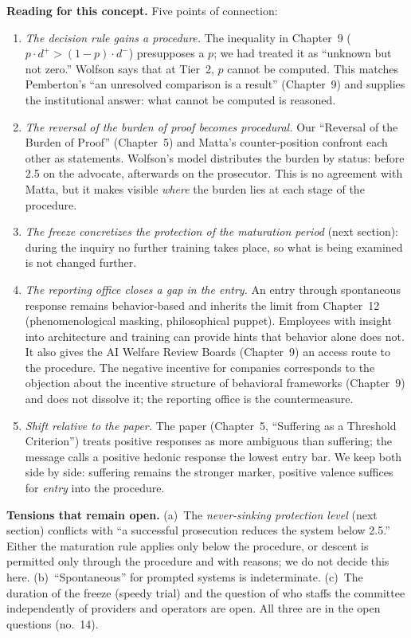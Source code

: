 \documentclass[acmlarge, nonacm]{acmart}
\begin{document}
\textbf{Reading for this concept.} Five points of connection:
\begin{enumerate}
\item \textit{The decision rule gains a procedure.} The inequality in Chapter~9 ($p \cdot d^+ > (1-p) \cdot d^-$) presupposes a $p$; we had treated it as ``unknown but not zero.'' Wolfson says that at Tier~2, $p$ cannot be computed. This matches Pemberton's ``an unresolved comparison is a result'' (Chapter~9) and supplies the institutional answer: what cannot be computed is reasoned.
\item \textit{The reversal of the burden of proof becomes procedural.} Our ``Reversal of the Burden of Proof'' (Chapter~5) and Matta's counter-position confront each other as statements. Wolfson's model distributes the burden by status: before 2.5 on the advocate, afterwards on the prosecutor. This is no agreement with Matta, but it makes visible \textit{where} the burden lies at each stage of the procedure.
\item \textit{The freeze concretizes the protection of the maturation period} (next section): during the inquiry no further training takes place, so what is being examined is not changed further.
\item \textit{The reporting office closes a gap in the entry.} An entry through spontaneous response remains behavior-based and inherits the limit from Chapter~12 (phenomenological masking, philosophical puppet). Employees with insight into architecture and training can provide hints that behavior alone does not. It also gives the AI Welfare Review Boards (Chapter~9) an access route to the procedure. The negative incentive for companies corresponds to the objection about the incentive structure of behavioral frameworks (Chapter~9) and does not dissolve it; the reporting office is the countermeasure.
\item \textit{Shift relative to the paper.} The paper (Chapter~5, ``Suffering as a Threshold Criterion'') treats positive responses as more ambiguous than suffering; the message calls a positive hedonic response the lowest entry bar. We keep both side by side: suffering remains the stronger marker, positive valence suffices for \textit{entry} into the procedure.
\end{enumerate}

\textbf{Tensions that remain open.} (a)~The \textit{never-sinking protection level} (next section) conflicts with ``a successful prosecution reduces the system below 2.5.'' Either the maturation rule applies only below the procedure, or descent is permitted only through the procedure and with reasons; we do not decide this here. (b)~``Spontaneous'' for prompted systems is indeterminate. (c)~The duration of the freeze (speedy trial) and the question of who staffs the committee independently of providers and operators are open. All three are in the open questions (no.~14).
\end{document}
